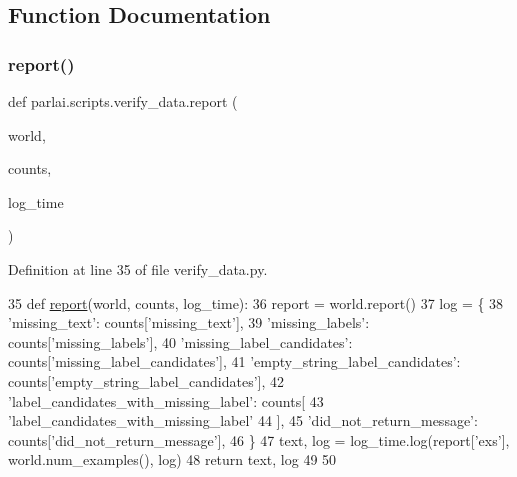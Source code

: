 \subsection{Function Documentation}
\mbox{\label{namespaceparlai_1_1scripts_1_1verify__data_a26153466b8f1f0c901768b4b3c56c885}} 
\subsubsection{\texorpdfstring{report()}{report()}}
{\footnotesize\ttfamily def parlai.\+scripts.\+verify\+\_\+data.\+report (\begin{DoxyParamCaption}\item[{}]{world,  }\item[{}]{counts,  }\item[{}]{log\+\_\+time }\end{DoxyParamCaption})}



Definition at line 35 of file verify\+\_\+data.\+py.


\begin{DoxyCode}
35 \textcolor{keyword}{def }\hyperlink{namespaceparlai_1_1scripts_1_1verify__data_a26153466b8f1f0c901768b4b3c56c885}{report}(world, counts, log\_time):
36     report = world.report()
37     log = \{
38         \textcolor{stringliteral}{'missing\_text'}: counts[\textcolor{stringliteral}{'missing\_text'}],
39         \textcolor{stringliteral}{'missing\_labels'}: counts[\textcolor{stringliteral}{'missing\_labels'}],
40         \textcolor{stringliteral}{'missing\_label\_candidates'}: counts[\textcolor{stringliteral}{'missing\_label\_candidates'}],
41         \textcolor{stringliteral}{'empty\_string\_label\_candidates'}: counts[\textcolor{stringliteral}{'empty\_string\_label\_candidates'}],
42         \textcolor{stringliteral}{'label\_candidates\_with\_missing\_label'}: counts[
43             \textcolor{stringliteral}{'label\_candidates\_with\_missing\_label'}
44         ],
45         \textcolor{stringliteral}{'did\_not\_return\_message'}: counts[\textcolor{stringliteral}{'did\_not\_return\_message'}],
46     \}
47     text, log = log\_time.log(report[\textcolor{stringliteral}{'exs'}], world.num\_examples(), log)
48     \textcolor{keywordflow}{return} text, log
49 
50 
\end{DoxyCode}
\mbox{\label{namespaceparlai_1_1scripts_1_1verify__data_aecfb15331606adc88ee4221c2945a17d}} 
